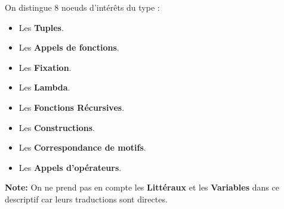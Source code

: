 \documentclass[12pt]{article}
\begin{document}
On distingue 8 noeuds d'intérêts du type :
\begin{itemize}
      \tightlist
      \item
            Les \textbf{Tuples}.
      \item
            Les \textbf{Appels de fonctions}.
      \item
            Les \textbf{Fixation}.
      \item
            Les \textbf{Lambda}.
      \item
            Les \textbf{Fonctions Récursives}.
      \item
            Les \textbf{Constructions}.
      \item
            Les \textbf{Correspondance de motifs}.
      \item
            Les \textbf{Appels d'opérateurs}.
\end{itemize}
\textbf{Note:} On ne prend pas en compte les \textbf{Littéraux} et les \textbf{Variables} dans ce descriptif car leurs traductions sont directes.
\end{document}
